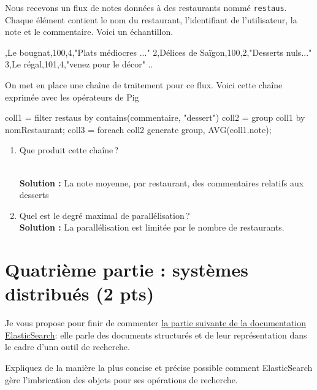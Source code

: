 \documentclass[10pt,a4paper]{article}
\newenvironment{smallverbatim}%
{\endgraf\small\verbatim}{\endverbatim}
\newenvironment{solution}[0]{
~\\ \color{red} \textbf{Solution : }\color{black}}{%
}
\begin{document}
Nous recevons un flux de notes données à des restaurants nommé \texttt{restaus}. Chaque
élément contient le nom du restaurant, l'identifiant
de l'utilisateur, la note et le commentaire. Voici un échantillon.

\begin{smallverbatim}
1,Le bougnat,100,4,"Plats médiocres ..."
2,Délices de Saïgon,100,2,"Desserts nuls..."
3,Le régal,101,4,"venez pour le décor"
..
\end{smallverbatim}

On met en place une chaîne de traitement pour ce flux. Voici cette chaîne exprimée avec les opérateurs de Pig 

\begin{smallverbatim}
coll1 = filter restaus by contains(commentaire, "dessert")
coll2 = group coll1 by nomRestaurant;
coll3  = foreach coll2 generate group, AVG(coll1.note);
\end{smallverbatim} 

\begin{enumerate}
 \item Que produit cette chaîne\,?
 

\begin{solution}
La note moyenne, par restaurant, des commentaires relatifs aux desserts
\end{solution}
 
 \item Quel est le degré maximal de parallélisation\,?
\begin{solution}
La parallélisation est limitée par le nombre de restaurants.
\end{solution}

\end{enumerate}

\section*{Quatrième partie : systèmes distribués (2 pts)}

Je vous propose pour finir de commenter 
\href{https://www.elastic.co/guide/en/elasticsearch/guide/current/nested-objects.html}{la partie suivante de la documentation
ElasticSearch}: elle parle des documents structurés et de leur représentation dans le 
cadre d'unn outil de recherche.

Expliquez de la manière la plus concise et précise possible comment ElasticSearch gère
l'imbrication des objets pour ses opérations de recherche.
\end{document}
